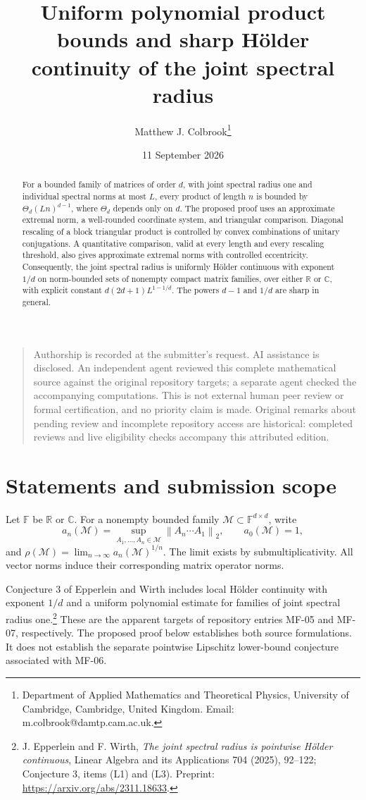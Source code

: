\documentclass[11pt]{article}
\title{Uniform polynomial product bounds and sharp H\"older continuity of the joint spectral radius}
\author{Matthew J. Colbrook\thanks{Department of Applied Mathematics and Theoretical Physics, University of Cambridge, Cambridge, United Kingdom. Email: m.colbrook@damtp.cam.ac.uk.}}\date{11 September 2026}
\theoremstyle{remark}\newtheorem{remark}[theorem]{Remark}
\newcommand{\F}{\mathbb F}
\newcommand{\R}{\mathbb R}
\newcommand{\C}{\mathbb C}
\newcommand{\norm}[1]{\left\lVert #1\right\rVert_2}
\begin{document}
\maketitle
\begin{quote}\small
Authorship is recorded at the submitter's request. AI assistance is disclosed. An independent agent reviewed this complete mathematical source against the original repository targets; a separate agent checked the accompanying computations. This is not external human peer review or formal certification, and no priority claim is made. Original remarks about pending review and incomplete repository access are historical: completed reviews and live eligibility checks accompany this attributed edition.
\end{quote}
\begin{abstract}
For a bounded family of matrices of order $d$, with joint spectral radius one and individual spectral norms at most $L$, every product of length $n$ is bounded by $\Theta_d(Ln)^{d-1}$, where $\Theta_d$ depends only on $d$. The proposed proof uses an approximate extremal norm, a well-rounded coordinate system, and triangular comparison. Diagonal rescaling of a block triangular product is controlled by convex combinations of unitary conjugations. A quantitative comparison, valid at every length and every rescaling threshold, also gives approximate extremal norms with controlled eccentricity. Consequently, the joint spectral radius is uniformly H\"older continuous with exponent $1/d$ on norm-bounded sets of nonempty compact matrix families, over either $\R$ or $\C$, with explicit constant $d(2d+1)L^{1-1/d}$. The powers $d-1$ and $1/d$ are sharp in general.
\end{abstract}

\section{Statements and submission scope}
Let $\F$ be $\R$ or $\C$. For a nonempty bounded family $\mathcal M\subset\F^{d\times d}$, write
\[
 a_n(\mathcal M)=\sup_{A_1,\ldots,A_n\in\mathcal M}
                    \norm{A_n\cdots A_1},\qquad a_0(\mathcal M)=1,
\]
and $\rho(\mathcal M)=\lim_{n\to\infty}a_n(\mathcal M)^{1/n}$. The limit exists by submultiplicativity. All vector norms induce their corresponding matrix operator norms.

Conjecture 3 of Epperlein and Wirth includes local H\"older continuity with exponent $1/d$ and a uniform polynomial estimate for families of joint spectral radius one.\footnote{J. Epperlein and F. Wirth, \emph{The joint spectral radius is pointwise H\"older continuous}, Linear Algebra and its Applications 704 (2025), 92--122; Conjecture 3, items (L1) and (L3). Preprint: \url{https://arxiv.org/abs/2311.18633}.} These are the apparent targets of repository entries MF-05 and MF-07, respectively. The proposed proof below establishes both source formulations. It does not establish the separate pointwise Lipschitz lower-bound conjecture associated with MF-06.
\end{document}
